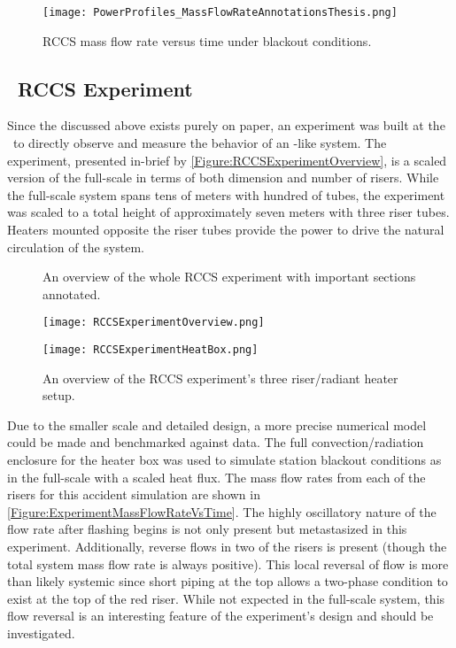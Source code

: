 \begin{figure}%
    \centering
    \caption[RCCS mass flow rate under blackout conditions]{RCCS mass flow rate versus time under blackout conditions.}%
    \label{Figure:RCCSFullScaleMassFlowRate}%
    \texttt{[image: PowerProfiles\_MassFlowRateAnnotationsThesis.png]}%
\end{figure}

\subsection{\TheUniversity\ RCCS Experiment}
Since the  discussed above exists purely on paper, an experiment was built at the \TheUniversity\ to directly observe and measure the behavior of an -like system.
The experiment, presented in-brief by \cref{Figure:RCCSExperimentOverview}, is a scaled version of the full-scale  in terms of both dimension and number of risers.
While the full-scale system spans tens of meters with hundred of tubes, the experiment was scaled to a total height of approximately seven meters with three riser tubes.
Heaters mounted opposite the riser tubes provide the power to drive the natural circulation of the system.

\begin{figure}%
    \centering
    \caption[RCCS Experiment Full System diagram]{An overview of the whole RCCS experiment with important sections annotated.}%
    \label{Figure:RCCSExperimentOverview}%
    \texttt{[image: RCCSExperimentOverview.png]}
    \vspace*{4em}
    \centering
    \caption[RCCS Experiment Three Riser diagram]{An overview of the RCCS experiment's three riser/radiant heater setup.}%
    \label{Figure:RCCSExperimentHeatBox}%
    \texttt{[image: RCCSExperimentHeatBox.png]}%
\end{figure}

Due to the smaller scale and detailed design, a more precise numerical model could be made and benchmarked against data.
The full convection/radiation enclosure for the heater box was used to simulate station blackout conditions as in the full-scale with a scaled heat flux.
The mass flow rates from each of the risers for this accident simulation are shown in \cref{Figure:ExperimentMassFlowRateVsTime}.
The highly oscillatory nature of the flow rate after flashing begins is not only present but metastasized in this experiment.
Additionally, reverse flows in two of the risers is present (though the total system mass flow rate is always positive).
This local reversal of flow is more than likely systemic since short piping at the top allows a two-phase condition to exist at the top of the red riser.
While not expected in the full-scale system, this flow reversal is an interesting feature of the experiment's design and should be investigated.

